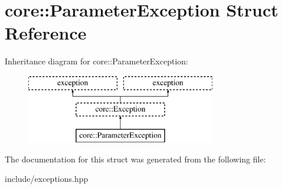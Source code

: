 \hypertarget{structcore_1_1_parameter_exception}{\section{core\-:\-:Parameter\-Exception Struct Reference}
\label{structcore_1_1_parameter_exception}
}
Inheritance diagram for core\-:\-:Parameter\-Exception\-:\begin{figure}[H]
\begin{center}
\leavevmode
\includegraphics[height=3.000000cm]{structcore_1_1_parameter_exception}
\end{center}
\end{figure}


The documentation for this struct was generated from the following file\-:\begin{DoxyCompactItemize}
\item 
include/exceptions.\-hpp\end{DoxyCompactItemize}
